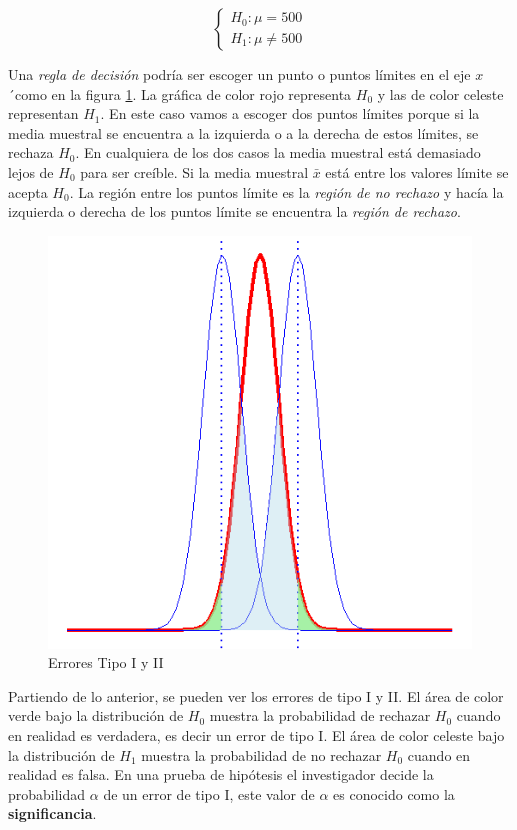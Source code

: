 \documentclass[letterpaper,]{book}
\begin{document}
\begin{equation} 
\begin{cases} 
H_0: \mu = 500 \\ 
H_1: \mu \neq 500
\end{cases} 
\end{equation}

Una \emph{regla de decisión} podría ser escoger un punto o puntos límites en el eje \(x\)´como en la figura \ref{fig:pht}. La gráfica de color rojo representa \(H_0\) y las de color celeste representan \(H_1\). En este caso vamos a escoger dos puntos límites porque si la media muestral se encuentra a la izquierda o a la derecha de estos límites, se rechaza \(H_0\). En cualquiera de los dos casos la media muestral está demasiado lejos de \(H_0\) para ser creíble. Si la media muestral \(\bar{x}\) está entre los valores límite se acepta \(H_0\). La región entre los puntos límite es la \emph{región de no rechazo} y hacía la izquierda o derecha de los puntos límite se encuentra la \emph{región de rechazo}.

\begin{figure}[h!]

{\centering \includegraphics[width=0.6\linewidth]{phtest} 

}

\caption{Errores Tipo I y II}\label{fig:pht}
\end{figure}

Partiendo de lo anterior, se pueden ver los errores de tipo I y II. El área de color verde bajo la distribución de \(H_0\) muestra la probabilidad de rechazar \(H_0\) cuando en realidad es verdadera, es decir un error de tipo I. El área de color celeste bajo la distribución de \(H_1\) muestra la probabilidad de no rechazar \(H_0\) cuando en realidad es falsa. En una prueba de hipótesis el investigador decide la probabilidad \(\alpha\) de un error de tipo I, este valor de \(\alpha\) es conocido como la \textbf{significancia}.
\end{document}
